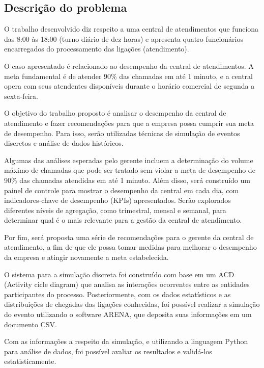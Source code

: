 \subsection{Descrição do problema}
\label{section: descricao}
O trabalho desenvolvido diz respeito a uma central de atendimentos que funciona das 8:00 às 18:00 (turno diário de dez horas) e apresenta quatro funcionários encarregados do processamento das ligações (atendimento).

O caso apresentado é relacionado ao desempenho da central de atendimentos. A meta fundamental é de atender 90\% das chamadas em até 1 minuto, e a central opera com seus atendentes disponíveis durante o horário comercial de segunda a sexta-feira.

O objetivo do trabalho proposto é analisar o desempenho da central de atendimento e fazer recomendações para que a empresa possa cumprir sua meta de desempenho. Para isso, serão utilizadas técnicas de simulação de eventos discretos e análise de dados históricos.

Algumas das análises esperadas pelo gerente incluem a determinação do volume máximo de chamadas que pode ser tratado sem violar a meta de desempenho de 90\% das chamadas atendidas em até 1 minuto. Além disso, será construído um painel de controle para mostrar o desempenho da central em cada dia, com indicadores-chave de desempenho (KPIs) apresentados. Serão explorados diferentes níveis de agregação, como trimestral, mensal e semanal, para determinar qual é o mais relevante para a gestão da central de atendimento.

Por fim, será proposta uma série de recomendações para o gerente da central de atendimento, a fim de que ele possa tomar medidas para melhorar o desempenho da empresa e atingir novamente a meta estabelecida.

O sistema para a simulação discreta foi construído com base em um ACD (Activity cicle diagram) que analisa as interações ocorrentes entre as entidades participantes do processo. Posteriormente, com os dados estatísticos e as distribuições de chegadas das ligações conhecidas, foi possível realizar a simulação do evento utilizando o software ARENA, que deposita suas informações em um documento CSV. 

Com as informações a respeito da simulação, e utilizando a linguagem Python para análise de dados, foi possível avaliar os resultados e validá-los estatisticamente.

